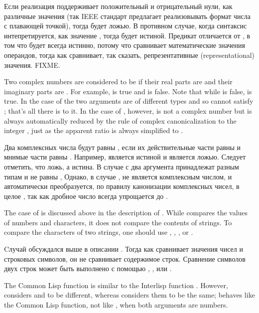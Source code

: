 \begin{defun}[Function]
Если реализация поддерживает положительный и отрицательный нули, как различные
значения (так IEEE стандарт предлагает реализовывать формат числа с плавающей
точкой), тогда  будет ложью. В противном случае, когда
синтаксис  интепретируется, как значение , тогда  будет истиной. Предикат \cdf{=} отличается от , в том что
 будет всегда истинно, потому что \cdf{=} сравнивает
математические значения операндов, тогда как  сравнивает, так сказать,
репрезентативные (representational) значения. FIXME.

Two complex numbers are considered to be 
if their real parts are  and their imaginary parts are .
For example,  is true and
 is false.
Note that while  is false,
 is true.
In the case of  the
two arguments are of different types
and so cannot satisfy ; that's all there is to it.
In the case of , however,
 is not a complex number but
is always automatically reduced by the rule of complex
canonicalization to the integer ,
just as the apparent ratio  is always simplified to .

Два комплексных числа будут равны , если их действительные части равны
 и мнимые части равны .
Например,  является истиной и
 является ложью.
Следует отметить, что  ложь,
а  истина.
В случае с 
два аргумента принадлежат разным типам и не равны ,
Однако, в случае ,
 не является комплексным числом, и автоматически преобразуется, по
правилу канонизации комплексных чисел, в целое , так как дробное число
 всегда упрощается до .

The case of  is discussed above in the description
of .  While  compares the values of numbers and
characters, it does not compare the contents of strings.  To compare
the characters of two strings, one should use , ,
, or .

Cлучай  обсуждался выше в описании . Тогда как
 сравнивает значения чисел и строковых символов, он не сравнивает
содержимое строк. Сравнение символов двух строк может быть выполнено с помощью
, ,  или .

\beforenoterule
\begin{incompatibility}
The Common Lisp function  is similar to the
Interlisp function .  However,  considers  and
 to be different, whereas  considers them to be the same;
 behaves like the Common Lisp \cdf{=} function, not like ,
when both arguments are numbers.
\end{incompatibility}
\afternoterule
\end{defun}

